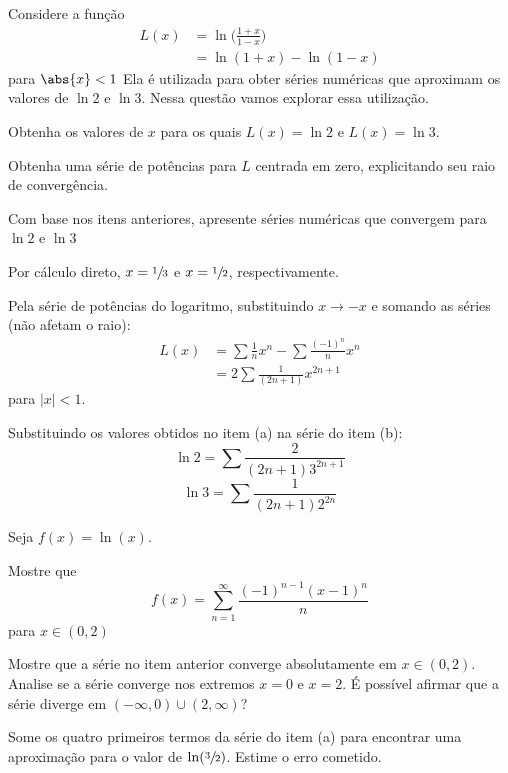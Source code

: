 \begin{exercises*}
\begin{exercise}
  Considere a função
  \begin{align*}
    L(x) & = \ln \bigg( \frac{1+x}{1-x}\bigg) \\
         & = \ln(1+x) - \ln(1-x)
  \end{align*}
  para $\abs{x} < 1$
  Ela é utilizada para obter séries numéricas que aproximam os valores de $\ln 2$ e $\ln 3$.
  Nessa questão vamos explorar essa utilização.
  \begin{alphalist}
      \item Obtenha os valores de $x$ para os quais $L(x)=\ln 2$ e $L(x)=\ln 3$.
      \item Obtenha uma série de potências para $L$ centrada em zero, explicitando seu raio de convergência.
      \item Com base nos itens anteriores, apresente séries numéricas que convergem para $\ln 2$ e $\ln 3$
  \end{alphalist}
  \begin{answer}
    \begin{alphalist}
      \item Por cálculo direto, \(x=\sfrac{1}{3}\) e \(x=\sfrac{1}{2}\), respectivamente.
      \item Pela série de potências do logaritmo, substituindo $x \to - x$
            e somando as séries (não afetam o raio):
        \begin{align*}
          L(x) & = \sum \frac{1}{n}x^n - \sum \frac{(-1)^n}{n}x^n \\
               & = 2\sum \frac{1}{(2n+1)}x^{2n+1}
        \end{align*}
        para $|x| < 1$.
      \item Substituindo os valores obtidos no item (a) na série do item (b):
        \[\ln 2 = \sum \frac{2}{(2n+1)3^{2n+1}}\]
        \[\ln 3 = \sum \frac{1}{(2n+1)2^{2n}}\]
    \end{alphalist}
  \end{answer}
\end{exercise}


\begin{exercise} Seja $f(x)=\ln(x)$.
  \begin{alphalist}
    \item Mostre que \[f(x)=\sum_{n=1}^\infty\frac{(-1)^{n-1}(x-1)^n}{n}\] para \(x\in (0,2)\)
    \item Mostre que a série no item anterior converge absolutamente em $x\in (0,2)$.
        Analise se a série converge nos extremos $x=0$ e $x=2$.
        É possível afirmar que a série diverge em $(-\infty, 0)\cup (2, \infty)$?
    \item Some os quatro primeiros termos da série do item (a)
        para encontrar uma aproximação para o valor de $\ln(\sfrac{3}{2})$.
        Estime o erro cometido.
  \end{alphalist}
\end{exercise}


\end{exercises*}
